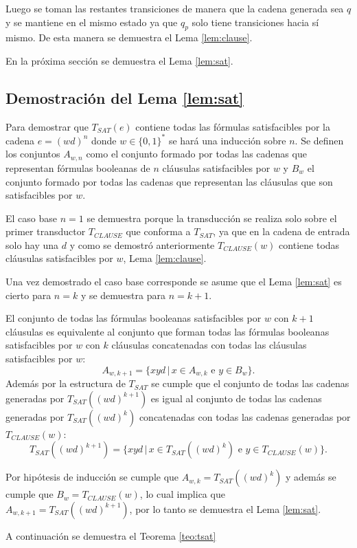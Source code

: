 Luego se toman las restantes transiciones de manera que la cadena generada sea $q$ y se mantiene en el mismo estado ya que $q_p$ solo tiene transiciones hacia sí mismo. De esta manera se demuestra el Lema \ref{lem:clause}. 

En la próxima sección se demuestra el Lema \ref{lem:sat}.

\subsection{Demostración del Lema \ref{lem:sat}}

Para demostrar que $T_{SAT}(e)$ contiene todas las fórmulas satisfacibles por la cadena $e=(wd)^n$
donde $w\in\{0,1\}^*$ se hará una inducción sobre $n$. Se definen los conjuntos $A_{w,n}$ como el 
conjunto formado por todas las cadenas que representan fórmulas booleanas de $n$ cláusulas satisfacibles 
por $w$ y $B_w$ el conjunto formado por todas las cadenas que representan las cláusulas que son satisfacibles 
por $w$. 

El caso base $n=1$ se demuestra porque la transducción se realiza solo sobre el primer transductor $T_{CLAUSE}$
que conforma a $T_{SAT}$, ya que en la cadena de entrada solo hay una $d$ y como se demostró anteriormente $T_{CLAUSE}(w)$ contiene todas cláusulas satisfacibles
por $w$, Lema \ref{lem:clause}. 

Una vez demostrado el caso base corresponde se asume que el Lema \ref{lem:sat} es cierto para $n=k$ y se demuestra para $n=k+1$. 

El conjunto de todas las fórmulas booleanas satisfacibles por  $w$ con $k+1$ cláusulas es equivalente al conjunto que forman todas las fórmulas booleanas satisfacibles por $w$ con $k$ cláusulas concatenadas con todas las cláusulas satisfacibles por $w$:
$$A_{w,k+1}=\{xyd\,|\,x\in A_{w,k} \text{ e } y\in B_w\}.$$
Además por la estructura de $T_{SAT}$ se cumple que el conjunto de todas las cadenas
generadas por $T_{SAT}((wd)^{k+1})$ es igual al conjunto de todas las cadenas 
generadas por $T_{SAT}((wd)^{k})$ concatenadas con todas las cadenas generadas por $T_{CLAUSE}(w)$:  
$$T_{SAT}((wd)^{k+1})=\{xyd\,|\,x\in T_{SAT}((wd)^{k}) \text{ e } y\in T_{CLAUSE}(w)\}.$$

Por hipótesis de inducción se cumple que $A_{w,k}=T_{SAT}((wd)^{k})$ y además se cumple que $B_w=T_{CLAUSE}(w)$, lo cual implica que $A_{w,k+1}=T_{SAT}((wd)^{k+1})$, por lo tanto se demuestra el Lema \ref{lem:sat}.

A continuación se demuestra el Teorema \ref{teo:tsat}

